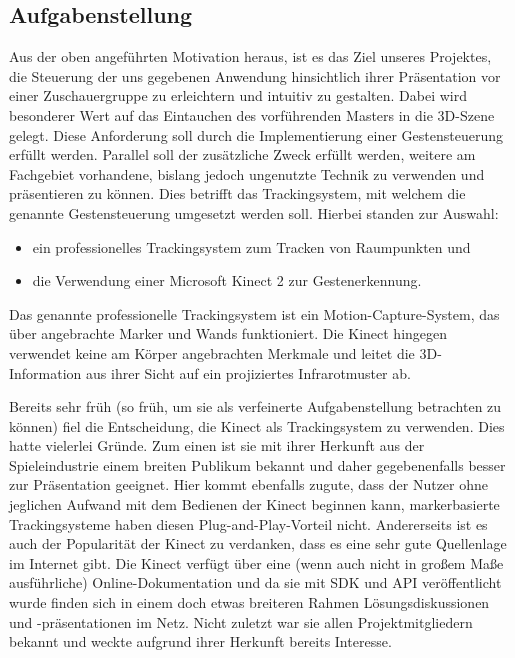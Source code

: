 	\subsection{Aufgabenstellung}\label{sec:aufg}
	Aus der oben angeführten Motivation heraus, ist es das Ziel unseres Projektes, die Steuerung der uns gegebenen Anwendung hinsichtlich ihrer Präsentation vor einer Zuschauergruppe zu erleichtern und intuitiv zu gestalten. Dabei wird besonderer Wert auf das Eintauchen des vorführenden Masters in die 3D-Szene gelegt. Diese Anforderung soll durch die Implementierung einer Gestensteuerung erfüllt werden. Parallel soll der zusätzliche Zweck erfüllt werden, weitere am Fachgebiet vorhandene, bislang jedoch ungenutzte Technik zu verwenden und präsentieren zu können. Dies betrifft das Trackingsystem, mit welchem die genannte Gestensteuerung umgesetzt werden soll. Hierbei standen zur Auswahl:
	\begin{itemize}
		\item ein professionelles Trackingsystem zum Tracken von Raumpunkten und
		\item die Verwendung einer Microsoft Kinect 2 zur Gestenerkennung.
	\end{itemize}
	Das genannte professionelle Trackingsystem ist ein Motion-Capture-System, das über angebrachte Marker und Wands funktioniert. Die Kinect hingegen verwendet keine am Körper angebrachten Merkmale und leitet die 3D-Information aus ihrer Sicht auf ein projiziertes Infrarotmuster ab.\par 
	Bereits sehr früh (so früh, um sie als verfeinerte Aufgabenstellung betrachten zu können) fiel die Entscheidung, die Kinect als Trackingsystem zu verwenden. Dies hatte vielerlei Gründe. Zum einen ist sie mit ihrer Herkunft aus der Spieleindustrie einem breiten Publikum bekannt und daher gegebenenfalls besser zur Präsentation geeignet. Hier kommt ebenfalls zugute, dass der Nutzer ohne jeglichen Aufwand mit dem Bedienen der Kinect beginnen kann, markerbasierte Trackingsysteme haben diesen \glqq{}Plug-and-Play\grqq{}-Vorteil nicht. Andererseits ist es auch der Popularität der Kinect zu verdanken, dass es eine sehr gute Quellenlage im Internet gibt. Die Kinect verfügt über eine (wenn auch nicht in großem Maße ausführliche) Online-Dokumentation und da sie mit SDK und API veröffentlicht wurde finden sich in einem doch etwas breiteren Rahmen Lösungsdiskussionen und -präsentationen im Netz. Nicht zuletzt war sie allen Projektmitgliedern bekannt und weckte aufgrund ihrer Herkunft bereits Interesse.\par\medskip
